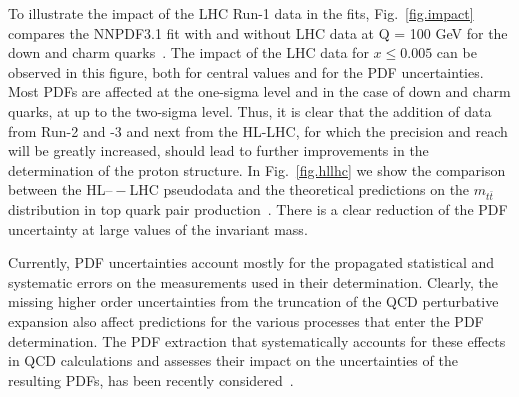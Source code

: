 To illustrate the impact of the LHC  Run-1  data in the fits, Fig.~\ref{fig.impact}  compares the  NNPDF3.1 fit  with and without  LHC data at Q = 100 GeV   for the down and charm quarks~\cite{Ball:2017nwa}.  The  impact of the LHC data for $x\leq 0.005$ can be observed in this figure,  both  for  central  values  and  for  the  PDF  uncertainties.  Most PDFs are affected at the one-sigma level and in  the  case of down and charm quarks,  at up to the two-sigma level.
   Thus, it is clear that the addition of data from Run-2 and -3 and next    from the   HL-LHC,  for  which  the  precision  and  reach  will  be  greatly  increased,  should  lead  to further improvements in the determination of the proton structure. In  Fig.~\ref{fig.hllhc} we show
the comparison between the HL$–-$LHC pseudodata and the theoretical predictions on  the   $m_{t\bar t}$ distribution in top quark pair production~\cite{Khalek:2018mdn}.  There is  a clear reduction of the  PDF uncertainty    at large values of the invariant mass.

 Currently, PDF uncertainties account mostly for the propagated statistical and systematic  errors  on  the  measurements  used  in  their  determination. Clearly, the missing higher order uncertainties  from the truncation of the QCD perturbative expansion also affect predictions for the various processes that enter the PDF determination. The    PDF extraction that systematically accounts for these effects  in  QCD calculations   and assesses  their impact on the  uncertainties of the resulting PDFs, has been recently considered~\cite{AbdulKhalek:2019bux}.
%

